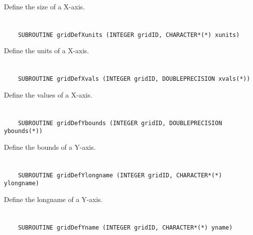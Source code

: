 Define the size of a X-axis.


\section*{\tt {}}

\begin{verbatim}
    SUBROUTINE gridDefXunits (INTEGER gridID, CHARACTER*(*) xunits)
\end{verbatim}

Define the units of a X-axis.


\section*{\tt {}}

\begin{verbatim}
    SUBROUTINE gridDefXvals (INTEGER gridID, DOUBLEPRECISION xvals(*))
\end{verbatim}

Define the values of a X-axis.


\section*{\tt {}}

\begin{verbatim}
    SUBROUTINE gridDefYbounds (INTEGER gridID, DOUBLEPRECISION ybounds(*))
\end{verbatim}

Define the bounds of a Y-axis.


\section*{\tt {}}

\begin{verbatim}
    SUBROUTINE gridDefYlongname (INTEGER gridID, CHARACTER*(*) ylongname)
\end{verbatim}

Define the longname of a Y-axis.


\section*{\tt {}}

\begin{verbatim}
    SUBROUTINE gridDefYname (INTEGER gridID, CHARACTER*(*) yname)
\end{verbatim}

